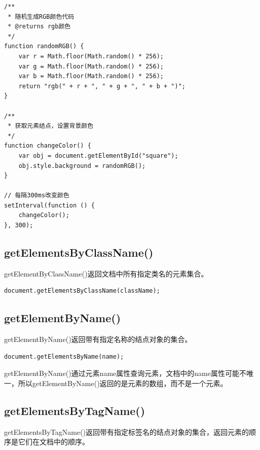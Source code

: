 \begin{lstlisting}[style=htmlcssjs, title=random\_color.js]
/**
 * 随机生成RGB颜色代码
 * @returns rgb颜色
 */
function randomRGB() {
    var r = Math.floor(Math.random() * 256);
    var g = Math.floor(Math.random() * 256);
    var b = Math.floor(Math.random() * 256);
    return "rgb(" + r + ", " + g + ", " + b + ")";
}

/**
 * 获取元素结点，设置背景颜色
 */
function changeColor() {
    var obj = document.getElementById("square");
    obj.style.background = randomRGB();
}

// 每隔300ms改变颜色
setInterval(function () {
    changeColor();
}, 300);
\end{lstlisting}

\vspace{0.5cm}

\subsection{getElementsByClassName()}

getElementByClassName()返回文档中所有指定类名的元素集合。\\

\begin{lstlisting}[style=htmlcssjs]
document.getElementsByClassName(className);
\end{lstlisting}

\vspace{0.5cm}

\subsection{getElementByName()}

getElementByName()返回带有指定名称的结点对象的集合。\\

\begin{lstlisting}[style=htmlcssjs]
document.getElementsByName(name);
\end{lstlisting}

getElementByName()通过元素name属性查询元素，文档中的name属性可能不唯一，所以getElementByName()返回的是元素的数组，而不是一个元素。\\

\subsection{getElementsByTagName()}

getElementsByTagName()返回带有指定标签名的结点对象的集合，返回元素的顺序是它们在文档中的顺序。\\

